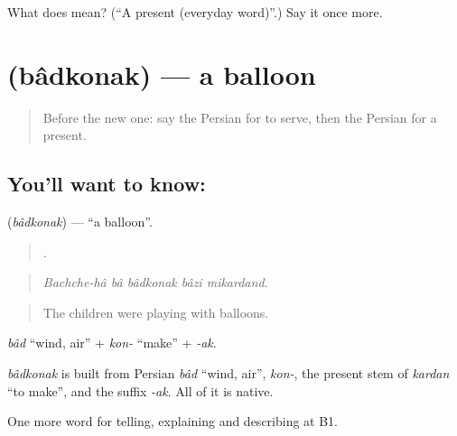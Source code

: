 \begin{tcolorbox}[breakable,colback=teal!4,colframe=teal!35!black,title={Before you move on}]
What does  mean? (\textquotedblleft{}A present (everyday word)\textquotedblright{}.) Say it once more.
\end{tcolorbox}
\section[\texorpdfstring{\fa{بادکنک} (bâdkonak)}{بادکنک (bâdkonak)}]{ (bâdkonak) — a balloon}

\label{lesson:FA-C341-badkonak}



\begin{quote}
Before the new one: say the Persian for to serve, then the Persian for a present.
\end{quote}

\subsection*{You'll want to know: }
\textbf{} (\emph{bâdkonak}) — \textquotedblleft{}a balloon\textquotedblright{}.

\begin{quote}
     .
\end{quote}

\begin{quote}
\emph{Bachche-hâ bâ bâdkonak bâzi mikardand.}
\end{quote}

\begin{quote}
The children were playing with balloons.
\end{quote}

\emph{bâd} \textquotedblleft{}wind, air\textquotedblright{} + \emph{kon-} \textquotedblleft{}make\textquotedblright{} + \emph{-ak}.

\begin{cousinweb}
\emph{bâdkonak} is built from Persian \emph{bâd} \textquotedblleft{}wind, air\textquotedblright{}, \emph{kon-}, the present stem of \emph{kardan} \textquotedblleft{}to make\textquotedblright{}, and the suffix \emph{-ak}. All of it is native.
\end{cousinweb}

\begin{grammarlens}[title={What you've built}]
One more word for telling, explaining and describing at B1.
\end{grammarlens}

